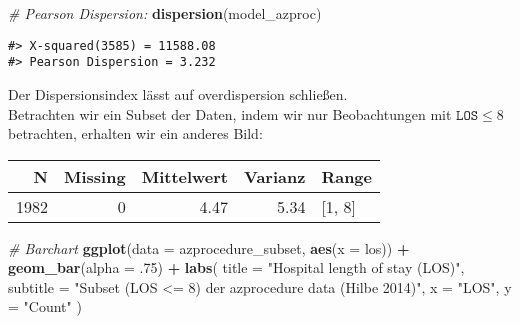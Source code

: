 \documentclass[ngerman,a4paper,]{scrartcl}
\newenvironment{Shaded}{\begin{snugshade}}{\end{snugshade}}
\newcommand{\CommentTok}[1]{\textcolor[rgb]{0.56,0.35,0.01}{\textit{#1}}}
\newcommand{\DataTypeTok}[1]{\textcolor[rgb]{0.13,0.29,0.53}{#1}}
\newcommand{\DecValTok}[1]{\textcolor[rgb]{0.00,0.00,0.81}{#1}}
\newcommand{\FloatTok}[1]{\textcolor[rgb]{0.00,0.00,0.81}{#1}}
\newcommand{\KeywordTok}[1]{\textcolor[rgb]{0.13,0.29,0.53}{\textbf{#1}}}
\newcommand{\NormalTok}[1]{#1}
\newcommand{\OperatorTok}[1]{\textcolor[rgb]{0.81,0.36,0.00}{\textbf{#1}}}
\newcommand{\StringTok}[1]{\textcolor[rgb]{0.31,0.60,0.02}{#1}}
\theoremstyle{definition}
\theoremstyle{definition}
\theoremstyle{definition}
\theoremstyle{remark}
\begin{document}
\begin{Shaded}
\begin{Highlighting}[]
\CommentTok{# Pearson Dispersion:}
\KeywordTok{dispersion}\NormalTok{(model_azproc)}
\end{Highlighting}
\end{Shaded}

\begin{verbatim}
#> X-squared(3585) = 11588.08
#> Pearson Dispersion = 3.232
\end{verbatim}

Der Dispersionsindex lässt auf overdispersion schließen.\\
Betrachten wir ein Subset der Daten, indem wir nur Beobachtungen mit \(\mathtt{LOS} \le 8\) betrachten, erhalten wir ein anderes Bild:

\begin{Shaded}
\end{Shaded}

\begin{table}[H]
\centering
\begin{tabular}{rrrrl}
\toprule
N & Missing & Mittelwert & Varianz & Range\\
\midrule
1982 & 0 & 4.47 & 5.34 & [1, 8]\\
\bottomrule
\end{tabular}
\end{table}

\begin{Shaded}
\begin{Highlighting}[]
\CommentTok{# Barchart}
\KeywordTok{ggplot}\NormalTok{(}\DataTypeTok{data =}\NormalTok{ azprocedure_subset, }\KeywordTok{aes}\NormalTok{(}\DataTypeTok{x =}\NormalTok{ los)) }\OperatorTok{+}
\StringTok{  }\KeywordTok{geom_bar}\NormalTok{(}\DataTypeTok{alpha =} \FloatTok{.75}\NormalTok{) }\OperatorTok{+}
\StringTok{  }\KeywordTok{labs}\NormalTok{(}
    \DataTypeTok{title =} \StringTok{"Hospital length of stay (LOS)"}\NormalTok{,}
    \DataTypeTok{subtitle =} \StringTok{"Subset (LOS <= 8) der azprocedure data (Hilbe 2014)"}\NormalTok{,}
    \DataTypeTok{x =} \StringTok{"LOS"}\NormalTok{, }\DataTypeTok{y =} \StringTok{"Count"} 
\NormalTok{  )}
\end{Highlighting}
\end{Shaded}
\end{document}
